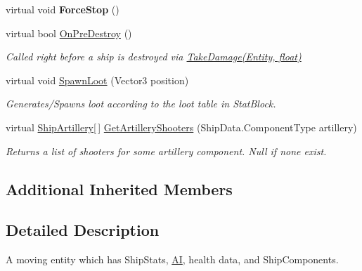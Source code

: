 \begin{DoxyCompactItemize}
\item 
\hypertarget{class_skyrates_1_1_entity_1_1_entity_ship_ad6563d11928b585846bb5725636c1c95}{virtual void {\bfseries Force\-Stop} ()}\label{class_skyrates_1_1_entity_1_1_entity_ship_ad6563d11928b585846bb5725636c1c95}

\item 
virtual bool \hyperlink{class_skyrates_1_1_entity_1_1_entity_ship_aeb574a950c7e9d3cd9e18feed7999345}{On\-Pre\-Destroy} ()
\begin{DoxyCompactList}\small\item\em Called right before a ship is destroyed via \hyperlink{class_skyrates_1_1_entity_1_1_entity_ship_a3ad30bc27cf8344c4acbfea78f8ee373}{Take\-Damage(\-Entity, float)} \end{DoxyCompactList}\item 
virtual void \hyperlink{class_skyrates_1_1_entity_1_1_entity_ship_aa874ee45513a0f394244ac752b37b506}{Spawn\-Loot} (Vector3 position)
\begin{DoxyCompactList}\small\item\em Generates/\-Spawns loot according to the loot table in Stat\-Block. \end{DoxyCompactList}\item 
virtual \hyperlink{class_skyrates_1_1_ship_1_1_ship_artillery}{Ship\-Artillery}\mbox{[}$\,$\mbox{]} \hyperlink{class_skyrates_1_1_entity_1_1_entity_ship_a75c4b113dd48dba91c0abaaa1372ed1a}{Get\-Artillery\-Shooters} (Ship\-Data.\-Component\-Type artillery)
\begin{DoxyCompactList}\small\item\em Returns a list of shooters for some artillery component. Null if none exist. \end{DoxyCompactList}\end{DoxyCompactItemize}
\subsection*{Additional Inherited Members}


\subsection{Detailed Description}
A moving entity which has Ship\-Stats, \hyperlink{namespace_skyrates_1_1_a_i}{A\-I}, health data, and Ship\-Components. 



